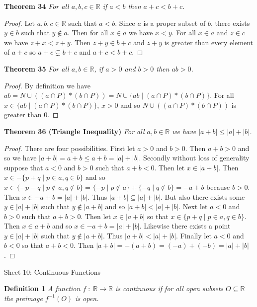 \documentclass{article}
\begin{document}
\begin{flushleft}
\textbf{Theorem 34}
\textsl{For all $a,b,c \in \mathbb{R}$ if $a<b$ then $a+c<b+c$.}
\begin{proof}
Let $a,b,c \in \mathbb{R}$ such that $a<b$. Since $a$ is a proper subset of $b$, there exists $y \in b$ such that $y \notin a$. Then for all $x \in a$ we have $x<y$. For all $x \in a$ and $z \in c$ we have $z+x<z+y$. Then $z+y \in b+c$ and $z+y$ is greater than every element of $a+c$ so $a+c \subsetneq b+c$ and $a+c < b+c$.
\end{proof}

\textbf{Theorem 35}
\textsl{For all $a,b \in \mathbb{R}$, if $a > 0$ and $b > 0$ then $ab > 0$.}
\begin{proof}
By definition we have $ab=N \cup ((a \cap P) * (b \cap P))=N \cup \{ab \mid (a \cap P) * (b \cap P)\}$. For all $x \in \{ab \mid (a \cap P) * (b \cap P)\}$, $x>0$ and so $N \cup ((a \cap P) * (b \cap P))$ is greater than $0$.
\end{proof}

\textbf{Theorem 36 (Triangle Inequality)}
\textsl{For all $a,b \in \mathbb{R}$ we have $|a+b| \leq |a| + |b|$.}
\begin{proof}
There are four possibilities. First let $a>0$ and $b>0$. Then $a+b>0$ and so we have $|a+b| = a+b \leq a+b = |a| + |b|$. Secondly without loss of generality suppose that $a<0$ and $b>0$ such that $a+b<0$. Then let $x \in |a+b|$. Then $x \in -\{p+q \mid p \in a, q \in b\}$ and so $x \in \{-p-q \mid p \notin a, q \notin b\}=\{-p \mid p \notin a\} + \{-q \mid q \notin b\}=-a+b$ because $b>0$. Then $x \in -a + b=|a| + |b|$. Thus $|a+b| \subseteq |a| + |b|$. But also there exists some $y \in |a|+|b|$ such that $y \notin |a+b|$ and so $|a+b| < |a| + |b|$. Next let $a<0$ and $b>0$ such that $a+b>0$. Then let $x \in |a+b|$ so that $x \in \{p+q \mid p \in a, q \in b\}$. Then $x \in a+b$ and so $x \in -a + b=|a|+|b|$. Likewise there exists a point $y \in |a|+|b|$ such that $y \notin |a+b|$. Thus $|a+b| < |a|+|b|$. Finally let $a<0$ and $b<0$ so that $a+b<0$. Then $|a+b|=-(a+b)=(-a)+(-b)=|a|+|b|$.
\end{proof}

\newpage

\Large

Sheet 10: Continuous Functions\newline

\normalsize

\textbf{Definition 1}
\textsl{A function $f \; : \; \mathbb{R} \rightarrow \mathbb{R}$ is continuous if for all open subsets $O \subseteq \mathbb{R}$ the preimage $f^{-1} (O)$ is open.}\newline


\end{flushleft}
\end{document}

